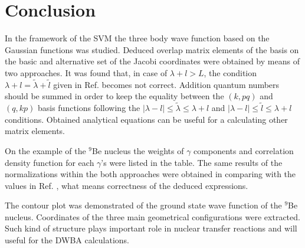\documentclass[12pt,a4paper,twoside]{article}
\begin{document}
\section*{Conclusion}
In the framework of the SVM the three body wave function based on the Gaussian functions was studied. Deduced overlap matrix elements of the basis on the basic and alternative set of the Jacobi coordinates were obtained by means of two approaches. It was found that, in case of $\lambda + l > L$, the condition $\lambda + l = \tilde{\lambda} + \tilde{l}$ given in Ref. \cite{suzuki1998stochastic} becomes not correct. Addition quantum numbers should be summed in order to keep the equality between the $(k,pq)$ and $(q,kp)$  basis functions following the $|\lambda - l| \le \tilde{\lambda} \le \lambda +l $ and $|\lambda - l| \le \tilde{l} \le \lambda +l $ conditions. Obtained analytical equations can be useful for a calculating other matrix elements. 

On the example of the $^9$Be nucleus the weights of $\gamma$ components and correlation density function for each $\gamma$'s were listed in the table. The same results of the normalizations within the both approaches were obtained in comparing with the values in Ref. \cite{voronchev1994analysis}, what means correctness of the deduced expressions.

The contour plot was demonstrated of the ground state wave function of the $^9$Be nucleus. Coordinates of the three main geometrical configurations were extracted. Such kind of structure plays important role in nuclear transfer reactions and will useful for the DWBA calculations. 





\end{document}
